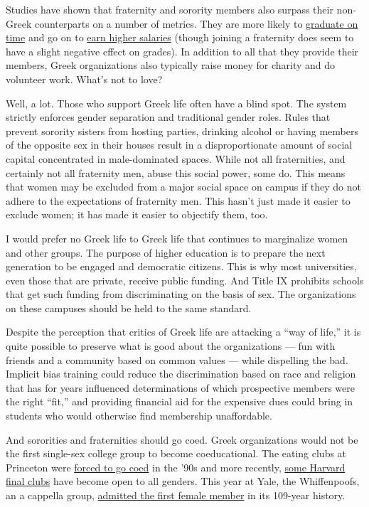 Studies have shown that fraternity and sorority members also surpass
their non-Greek counterparts on a number of metrics. They are more
likely to
\href{https://www.sciencedirect.com/science/article/pii/S2214804314000147?via\%3Dihub}{graduate
on time} and go on to
\href{https://papers.ssrn.com/sol3/papers.cfm?abstract_id=2763720}{earn
higher salaries} (though joining a fraternity does seem to have a slight
negative effect on grades). In addition to all that they provide their
members, Greek organizations also typically raise money for charity and
do volunteer work. What's not to love?

Well, a lot. Those who support Greek life often have a blind spot. The
system strictly enforces gender separation and traditional gender roles.
Rules that prevent sorority sisters from hosting parties, drinking
alcohol or having members of the opposite sex in their houses result in
a disproportionate amount of social capital concentrated in
male-dominated spaces. While not all fraternities, and certainly not all
fraternity men, abuse this social power, some do. This means that women
may be excluded from a major social space on campus if they do not
adhere to the expectations of fraternity men. This hasn't just made it
easier to exclude women; it has made it easier to objectify them, too.

I would prefer no Greek life to Greek life that continues to marginalize
women and other groups. The purpose of higher education is to prepare
the next generation to be engaged and democratic citizens. This is why
most universities, even those that are private, receive public funding.
And Title IX prohibits schools that get such funding from discriminating
on the basis of sex. The organizations on these campuses should be held
to the same standard.

Despite the perception that critics of Greek life are attacking a ``way
of life,'' it is quite possible to preserve what is good about the
organizations --- fun with friends and a community based on common
values --- while dispelling the bad. Implicit bias training could reduce
the discrimination based on race and religion that has for years
influenced determinations of which prospective members were the right
``fit,'' and providing financial aid for the expensive dues could bring
in students who would otherwise find membership unaffordable.

And sororities and fraternities should go coed. Greek organizations
would not be the first single-sex college group to become coeducational.
The eating clubs at Princeton were
\href{https://www.nytimes.com/1991/01/28/nyregion/princeton-women-forge-a-new-era.html}{forced
to go coed} in the '90s and more recently,
\href{http://www.thecrimson.com/article/2017/5/25/coping-with-coed/}{some
Harvard final clubs} have become open to all genders. This year at Yale,
the Whiffenpoofs, an a cappella group,
\href{https://www.nytimes.com/2018/02/20/nyregion/yale-whiffenpoofs-first-woman.html}{admitted
the first female member} in its 109-year history.

